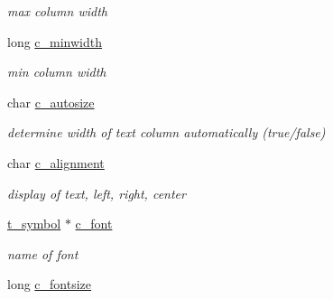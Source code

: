 \begin{DoxyCompactItemize}
\begin{DoxyCompactList}\small\item\em max column width \item\end{DoxyCompactList}\item 
\hypertarget{structt__jcolumn_a8336b6b1118c4bedb00386401f6cacdf}{
long \hyperlink{structt__jcolumn_a8336b6b1118c4bedb00386401f6cacdf}{c\_\-minwidth}}
\label{structt__jcolumn_a8336b6b1118c4bedb00386401f6cacdf}

\begin{DoxyCompactList}\small\item\em min column width \item\end{DoxyCompactList}\item 
\hypertarget{structt__jcolumn_ac6850fe894bda76b66d51071ab6355df}{
char \hyperlink{structt__jcolumn_ac6850fe894bda76b66d51071ab6355df}{c\_\-autosize}}
\label{structt__jcolumn_ac6850fe894bda76b66d51071ab6355df}

\begin{DoxyCompactList}\small\item\em determine width of text column automatically (true/false) \item\end{DoxyCompactList}\item 
\hypertarget{structt__jcolumn_a9ce842077efc563853c148529d0de1eb}{
char \hyperlink{structt__jcolumn_a9ce842077efc563853c148529d0de1eb}{c\_\-alignment}}
\label{structt__jcolumn_a9ce842077efc563853c148529d0de1eb}

\begin{DoxyCompactList}\small\item\em display of text, left, right, center \item\end{DoxyCompactList}\item 
\hypertarget{structt__jcolumn_a8efc1096b7e7ba72357a46a1041b41d3}{
\hyperlink{structt__symbol}{t\_\-symbol} $\ast$ \hyperlink{structt__jcolumn_a8efc1096b7e7ba72357a46a1041b41d3}{c\_\-font}}
\label{structt__jcolumn_a8efc1096b7e7ba72357a46a1041b41d3}

\begin{DoxyCompactList}\small\item\em name of font \item\end{DoxyCompactList}\item 
\hypertarget{structt__jcolumn_a081cd12cbfc4ed8db5f4e7e42f66d879}{
long \hyperlink{structt__jcolumn_a081cd12cbfc4ed8db5f4e7e42f66d879}{c\_\-fontsize}}
\label{structt__jcolumn_a081cd12cbfc4ed8db5f4e7e42f66d879}


\end{DoxyCompactItemize}
